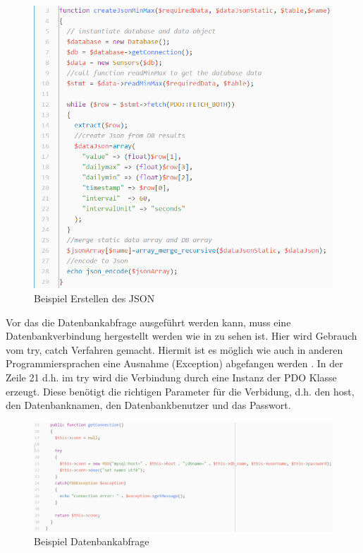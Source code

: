 \begin{figure}[h!]
	\centering
	\includegraphics[width=1\linewidth]{img/API_temperature_code_createJson}
	\caption{Beispiel Erstellen des JSON}
	\label{img:wetterstation}
\end{figure}

Vor das die Datenbankabfrage ausgeführt werden kann, muss eine Datenbankverbindung hergestellt werden wie in  zu sehen ist. Hier wird Gebrauch vom try, catch Verfahren gemacht. Hiermit ist es möglich wie auch in anderen Programmiersprachen eine Ausnahme (Exception) abgefangen werden \cite{Ausnahmebehandlung:ThePHPGroup}. In der Zeile 21 d.h. im try wird die Verbindung durch eine Instanz der PDO Klasse erzeugt. Diese benötigt die richtigen Parameter für die Verbidung, d.h. den host, den Datenbanknamen, den Datenbankbenutzer und das Passwort. 

\begin{figure}[h!]
	\centering
	\includegraphics[width=1\linewidth]{img/API_temperature_code_database}
	\caption{Beispiel Datenbankabfrage}
	\label{img:wetterstation}
\end{figure}

